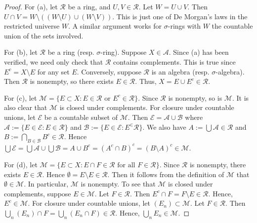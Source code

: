 \documentclass{article}
\begin{document}
\begin{proof}
For (a), let $\mathcal R$ be a ring, and $U, V \in \mathcal R$.  Let $W = U \cup V$.  Then $U \cap V = W \setminus ((W \setminus U) \cup (W \setminus V)) $. This is just one of De Morgan's laws in the restricted universe $W$.  A similar argument works for $\sigma$-rings with $W$ the countable union of the sets involved.

For (b), let $\mathcal R$ be a ring (resp. $\sigma$-ring).  Suppose $X \in \mathcal A$. Since (a) has been verified, we need only check that $\mathcal R$ contains complements.  This is true since $E^c = X \setminus E$ for any set $E$.  Conversely, suppose $\mathcal R$ is an algebra (resp. $\sigma$-algebra).  Then $\mathcal R$ is nonempty, so there exists $E \in \mathcal R$. Thus, $X = E \cup E^c \in \mathcal R$.

For (c), let $\mathcal M = \{ E \subset X : E \in \mathcal R \text{ or } E^c \in \mathcal R \}$.  Since $\mathcal R$ is nonempty, so is $\mathcal M$.  It is also clear that $\mathcal M$ is closed under complements. For closure under countable unions, let $\mathcal E$ be a countable subset of $\mathcal M$.  Then $\mathcal E = \mathcal A \cup \mathcal B$ where $\mathcal A := \{ E \in \mathcal E : E \in \mathcal R\}$ and $\mathcal B := \{ E \in \mathcal E : E^ \in \mathcal R\}$. We also have $A := \bigcup \mathcal A \in \mathcal R$ and $B := \bigcap_{B \in \mathcal B} B^c \in \mathcal R$.  Hence $\bigcup \mathcal E = \bigcup \mathcal A \cup \bigcup \mathcal B = A \cup B^c = (A^c \cap B)^c = (B \setminus A)^c \in \mathcal M$. 

For (d), let $\mathcal M = \{ E \subset X : E \cap F \in \mathcal R \text{ for all } F \in \mathcal R \}$. Since $\mathcal R$ is nonempty, there exists $E \in \mathcal R$.  Hence $\emptyset = E \setminus E \in \mathcal R$. Then it follows from the definition of $\mathcal M$ that $\emptyset \in \mathcal M$. In particular, $\mathcal M$ is nonempty.  To see that $\mathcal M$ is closed under complements, suppose $E \in \mathcal M$.  Let $F \in \mathcal R$.  Then $E^c \cap F = F \setminus E \in \mathcal R$.  Hence, $E^c \in \mathcal M$.  For closure under countable unions, let $(E_n) \subset \mathcal M$. Let $F \in \mathcal R$.  Then $\bigcup_n(E_n) \cap F = \bigcup_n (E_n \cap F)  \in \mathcal R$.  Hence, $\bigcup_n E_n \in \mathcal M$.
\end{proof}
\end{document}
